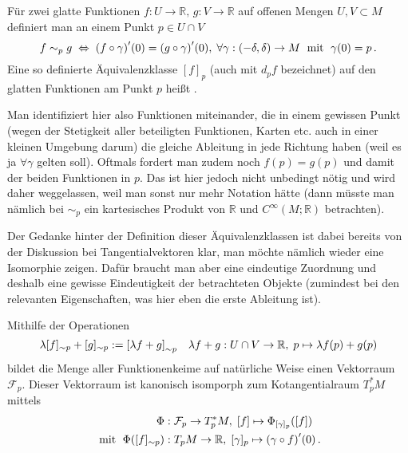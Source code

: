 \documentclass[../H_Analysis_main.tex]{subfiles}
\begin{document}
\begin{defi}[Funktionenkeim]
Für zwei glatte Funktionen $f: U \rightarrow \mathbb{R}, \, g: V \rightarrow \mathbb{R}$ auf offenen Mengen $U, V \subset M$ definiert man an einem Punkt $p \in U \cap V$
\begin{equation}
f \sim_p g \; \Leftrightarrow \; \qty(f \circ \gamma)'(0) = \qty(g \circ \gamma)'(0), \; \forall \gamma: \qty(-\delta, \delta) \rightarrow M \; \text{ mit } \; \gamma(0) = p \, .
\end{equation}
Eine so definierte Äquivalenzklasse $[f]_p$ (auch mit $d_p f$ bezeichnet) auf den glatten Funktionen am Punkt $p$ heißt .
\end{defi}
Man identifiziert hier also Funktionen miteinander, die in einem gewissen Punkt (wegen der Stetigkeit aller beteiligten Funktionen, Karten etc. auch in einer kleinen Umgebung darum) die gleiche Ableitung in jede Richtung haben (weil es ja $\forall \gamma$ gelten soll). Oftmals fordert man zudem noch $f(p) = g(p)$ und damit  der beiden Funktionen in $p$. Das ist hier jedoch nicht unbedingt nötig und wird daher weggelassen, weil man sonst nur mehr Notation hätte (dann müsste man nämlich bei $\sim_p$ ein kartesisches Produkt von $\mathbb{R}$ und $C^\infty(M; \mathbb{R})$ betrachten).


Der Gedanke hinter der Definition dieser Äquivalenzklassen ist dabei bereits von der Diskussion bei Tangentialvektoren klar, man möchte nämlich wieder eine Isomorphie zeigen. Dafür braucht man aber eine eindeutige Zuordnung und deshalb eine gewisse Eindeutigkeit der betrachteten Objekte (zumindest bei den relevanten Eigenschaften, was hier eben die erste Ableitung ist).


\begin{satz}
Mithilfe der Operationen 
\begin{equation}
\lambda [f]_{\sim p} + [g]_{\sim p} := \qty[\lambda f +g]_{\sim p} \quad \lambda f + g: U \cap V \rightarrow \mathbb{R}, \; p \mapsto \lambda f(p) + g(p)
\end{equation}
bildet die Menge aller Funktionenkeime auf natürliche Weise einen Vektorraum $\mathcal{F}_p$. Dieser Vektorraum ist kanonisch isomporph zum Kotangentialraum $T^*_p M$ mittels
\begin{equation}
\begin{split}
\Phi&: \mathcal{F}_p \rightarrow T^*_p M, \; [f] \mapsto \Phi_{[\gamma]_p}\qty([f]) 
\\
\text{ mit } \; \Phi\qty([f]_{\sim p})&: T_p M \rightarrow \mathbb{R}, \; [\gamma]_p \mapsto \qty(\gamma \circ f)'(0) \, .
\end{split}
\end{equation}
\end{satz}
\end{document}
